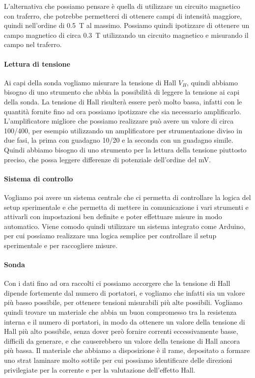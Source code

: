 \documentclass[fleqn,varvw,11pt,tightenlines]{memo}
\begin{document}
L'alternativa che possiamo pensare è quella di utilizzare un circuito magnetico con traferro, che potrebbe permetterci di ottenere campi di intensità maggiore, quindi nell'ordine di \SI{0.5}{\tesla} al massimo. Possiamo quindi ipotizzare di ottenere un campo magnetico di circa \SI{0.3}{\tesla} utilizzando un circuito magnetico e misurando il campo nel traferro.

\paragraph{Lettura di tensione} Ai capi della sonda vogliamo misurare la tensione di Hall $V_H$, quindi abbiamo bisogno di uno strumento che abbia la possibilità di leggere la tensione ai capi della sonda. La tensione di Hall risulterà essere però molto bassa, infatti con le quantità fornite fino ad ora possiamo ipotizzare che sia necessario amplificarlo. L'amplificatore migliore che possiamo realizzare può avere un valore di circa 100/400, per esempio utilizzando un amplificatore per strumentazione diviso in due fasi, la prima con guadagno 10/20 e la seconda con un guadagno simile. Quindi abbiamo bisogno di uno strumento per la lettura della tensione piuttosto preciso, che possa leggere differenze di potenziale dell'ordine del \si{\milli\volt}. 

\paragraph{Sistema di controllo} Vogliamo poi avere un sistema centrale che ci permetta di controllare la logica del setup sperimentale e che permetta di mettere in comunicazione i vari strumenti e attivarli con impostazioni ben definite e poter effettuare misure in modo automatico. Viene comodo quindi utilizzare un sistema integrato come Arduino, per cui possiamo realizzare una logica semplice per controllare il setup sperimentale e per raccogliere misure. 

\paragraph{Sonda} Con i dati fino ad ora raccolti ci possiamo accorgere che la tensione di Hall dipende fortemente dal numero di portatori, e vogliamo che infatti sia un valore più basso possibile, per ottenere tensioni misurabili più alte possibili. Vogliamo quindi trovare un materiale che abbia un buon compromesso tra la resistenza interna e il numero di portatori, in modo da ottenere un valore della tensione di Hall più alto possibile, senza dover però fornire correnti eccessivamente basse, difficili da generare, e che causerebbero un valore della tensione di Hall ancora più bassa. Il materiale che abbiamo a disposizione è il rame, depositato a formare uno strat laminare molto sottile per cui possiamo identificare delle direzioni privilegiate per la corrente e per la valutazione dell'effetto Hall. 
\end{document}
